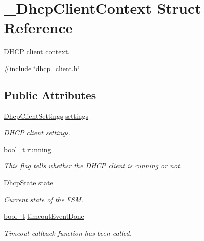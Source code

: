 \hypertarget{struct__DhcpClientContext}{}\section{\+\_\+\+Dhcp\+Client\+Context Struct Reference}
\label{struct__DhcpClientContext}


D\+H\+CP client context.  




{\ttfamily \#include \char`\"{}dhcp\+\_\+client.\+h\char`\"{}}

\subsection*{Public Attributes}
\begin{DoxyCompactItemize}
\item 
\hyperlink{structDhcpClientSettings}{Dhcp\+Client\+Settings} \hyperlink{struct__DhcpClientContext_acc01c3ef8f705d1dc40c2fdbea49dfa2}{settings}
\begin{DoxyCompactList}\small\item\em D\+H\+CP client settings. \end{DoxyCompactList}\item 
\hyperlink{compiler__port_8h_a812d16e5494522586b3784e55d479912}{bool\+\_\+t} \hyperlink{struct__DhcpClientContext_a6d107c4fdd65d880aea27e5a02ece48e}{running}
\begin{DoxyCompactList}\small\item\em This flag tells whether the D\+H\+CP client is running or not. \end{DoxyCompactList}\item 
\hyperlink{dhcp__client_8h_ac6f9e98cfbc157d444ee4e20430d65d4}{Dhcp\+State} \hyperlink{struct__DhcpClientContext_a93d8a0f7b21aa13ae8b901c9b3cda016}{state}
\begin{DoxyCompactList}\small\item\em Current state of the F\+SM. \end{DoxyCompactList}\item 
\hyperlink{compiler__port_8h_a812d16e5494522586b3784e55d479912}{bool\+\_\+t} \hyperlink{struct__DhcpClientContext_ac1afec285507858d425b2643cf9c5d79}{timeout\+Event\+Done}
\begin{DoxyCompactList}\small\item\em Timeout callback function has been called. \end{DoxyCompactList}\item 

\end{DoxyCompactItemize}
